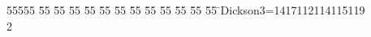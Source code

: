 %
%
\begin{tabbing}
55555 \= 55 \= 55 \= 55 \= 55 \= 55 \= 55 \= 55 \= 55 \= 55 \= 55 \= 55 \= 55 \= \>Dickson3=1417112114115119\\[0pt]
2\>\end{tabbing}
